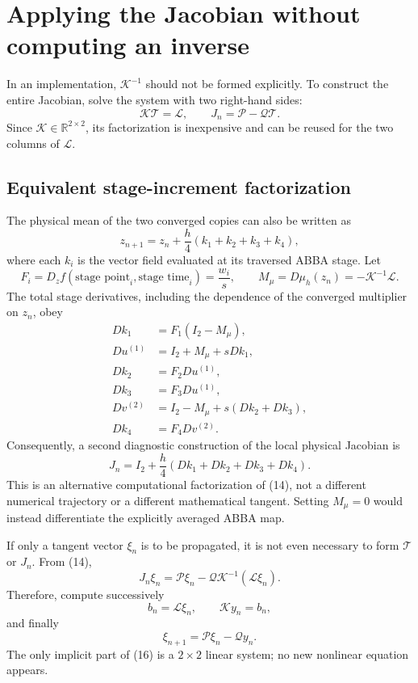 \documentclass[11pt,a4paper]{article}
\newcommand{\R}{\mathbb{R}}
\begin{document}
\section{Applying the Jacobian without computing an inverse}

In an implementation, $\mathcal K^{-1}$ should not be formed explicitly. To construct the
entire Jacobian, solve the system with two right-hand sides:
\[
 \boxed{
 \mathcal K\mathcal T=\mathcal L,
 \qquad
 J_n=\mathcal P-\mathcal Q\mathcal T.
 }
 \tag{15}
\]
Since $\mathcal K\in\R^{2\times2}$, its factorization is inexpensive and can be reused for
the two columns of $\mathcal L$.

\subsection{Equivalent stage-increment factorization}

The physical mean of the two converged copies can also be written as
\[
 z_{n+1}=z_n+\frac h4(k_1+k_2+k_3+k_4),
\]
where each $k_i$ is the vector field evaluated at its traversed ABBA stage.  Let
\[
 F_i=D_zf(\text{stage point}_i,\text{stage time}_i)=\frac{w_i}{s},
 \qquad
 M_\mu=D\mu_h(z_n)=-\mathcal K^{-1}\mathcal L.
\]
The total stage derivatives, including the dependence of the converged multiplier on
$z_n$, obey
\[
 \begin{aligned}
 Dk_1&=F_1(I_2-M_\mu),\\
 Du^{(1)}&=I_2+M_\mu+sDk_1,\\
 Dk_2&=F_2Du^{(1)},\\
 Dk_3&=F_3Du^{(1)},\\
 Dv^{(2)}&=I_2-M_\mu+s(Dk_2+Dk_3),\\
 Dk_4&=F_4Dv^{(2)}.
 \end{aligned}
\]
Consequently, a second diagnostic construction of the local physical Jacobian is
\[
 \boxed{
 J_n=I_2+\frac h4(Dk_1+Dk_2+Dk_3+Dk_4).
 }
\]
This is an alternative computational factorization of (14), not a different numerical
trajectory or a different mathematical tangent.  Setting $M_\mu=0$ would instead
differentiate the explicitly averaged ABBA map.

If only a tangent vector $\xi_n$ is to be propagated, it is not even necessary to form
$\mathcal T$ or $J_n$. From (14),
\[
 J_n\xi_n
 =\mathcal P\xi_n-\mathcal Q\mathcal K^{-1}(\mathcal L\xi_n).
\]
Therefore, compute successively
\[
 b_n=\mathcal L\xi_n,
 \qquad
 \mathcal K y_n=b_n,
\]
and finally
\[
 \boxed{
 \xi_{n+1}=\mathcal P\xi_n-\mathcal Qy_n.
 }
 \tag{16}
\]
The only implicit part of (16) is a $2\times2$ linear system; no new nonlinear equation
appears.
\end{document}
